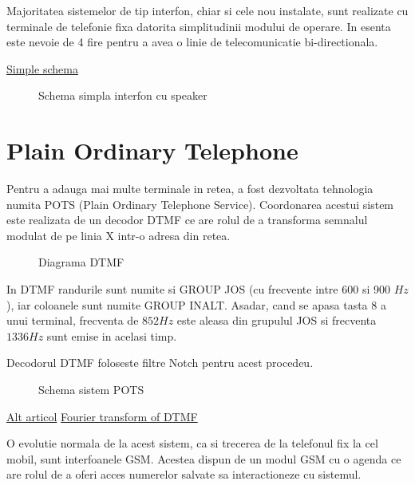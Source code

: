 Majoritatea sistemelor de tip interfon, chiar si cele nou instalate, sunt realizate cu terminale de telefonie fixa datorita simplitudinii modului de operare. In esenta este nevoie de 4 fire pentru a avea o linie de telecomunicatie bi-directionala.

\href{https://www.epanorama.net/documents/telecom/telephone_intercom.html}{Simple schema}

\begin{figure}[h!]
  \centering
  \caption{Schema simpla interfon cu speaker}
\end{figure}

\section {Plain Ordinary Telephone}

Pentru a adauga mai multe terminale in retea, a fost dezvoltata tehnologia numita POTS (Plain Ordinary Telephone Service). Coordonarea acestui sistem este realizata de un decodor DTMF ce are rolul de a transforma semnalul modulat de pe linia X intr-o adresa din retea. 

\begin{figure}[h!]
  \centering
  \caption{Diagrama DTMF}
\end{figure}

In DTMF randurile sunt numite si GROUP JOS (cu frecvente intre 600 si 900 $Hz$), iar coloanele sunt numite GROUP INALT. Asadar, cand se apasa tasta 8 a unui terminal, frecventa de $852 Hz$ este aleasa din grupulul JOS si frecventa $1336 Hz$ sunt emise in acelasi timp.


Decodorul DTMF foloseste filtre Notch pentru acest procedeu.

\begin{figure}[h!]
  \centering
  \caption{Schema sistem POTS}
\end{figure}

\cite{WinNT}



\href{https://www.nextiva.com/blog/what-is-pots.html}{Alt articol}
\href{https://www.researchgate.net/figure/Short-term-Fourier-transform-of-a-triplet-of-DTMF-tones-each-one-composed-of-two_fig1_320245002}{Fourier transform of DTMF}

O evolutie normala de la acest sistem, ca si trecerea de la telefonul fix la cel mobil, sunt interfoanele GSM. Acestea dispun de un modul GSM cu o agenda ce are rolul de a oferi acces numerelor salvate sa interactioneze cu sistemul.


